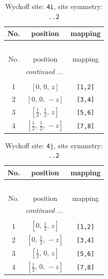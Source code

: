 \documentclass[fleqn,8pt]{jsarticle}
\begin{document}
\renewcommand{\arraystretch}{1.2}
\begin{longtable}{ccc}
\caption{Wyckoff site: {\tt 4i}, site symmetry: {\tt ..2}}
 \\
 \hline \hline
No. & position & mapping \\ \hline \endfirsthead

\multicolumn{2}{l}{\tablename\ \thetable{}} \\
 \hline \hline
No. & position & mapping \\ \hline \endhead

 \hline \hline
\multicolumn{2}{r}{\footnotesize\it continued ...} \\ \endfoot

 \hline \hline
\multicolumn{2}{r}{} \\ \endlastfoot

1 & $\left[ 0,\, 0,\, z \right]$ & {\tt [1,2]} \\ \hline
2 & $\left[ 0,\, 0,\, - z \right]$ & {\tt [3,4]} \\ \hline
3 & $\left[ \frac{1}{2},\, \frac{1}{2},\, z \right]$ & {\tt [5,6]} \\ \hline
4 & $\left[ \frac{1}{2},\, \frac{1}{2},\, - z \right]$ & {\tt [7,8]} \\
\end{longtable}
\renewcommand{\arraystretch}{1.2}
\begin{longtable}{ccc}
\caption{Wyckoff site: {\tt 4j}, site symmetry: {\tt ..2}}
 \\
 \hline \hline
No. & position & mapping \\ \hline \endfirsthead

\multicolumn{2}{l}{\tablename\ \thetable{}} \\
 \hline \hline
No. & position & mapping \\ \hline \endhead

 \hline \hline
\multicolumn{2}{r}{\footnotesize\it continued ...} \\ \endfoot

 \hline \hline
\multicolumn{2}{r}{} \\ \endlastfoot

1 & $\left[ 0,\, \frac{1}{2},\, z \right]$ & {\tt [1,2]} \\ \hline
2 & $\left[ 0,\, \frac{1}{2},\, - z \right]$ & {\tt [3,4]} \\ \hline
3 & $\left[ \frac{1}{2},\, 0,\, z \right]$ & {\tt [5,6]} \\ \hline
4 & $\left[ \frac{1}{2},\, 0,\, - z \right]$ & {\tt [7,8]} \\
\end{longtable}
\end{document}
